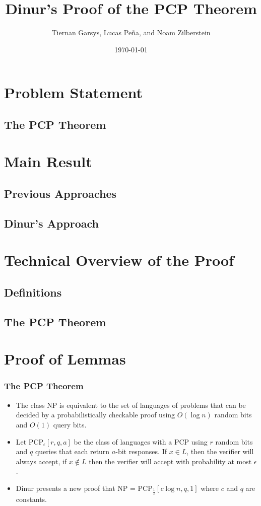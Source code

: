 \documentclass{beamer}
\title{Dinur's Proof of the PCP Theorem}
\author{Tiernan Garsys, Lucas Pe\~{n}a, and Noam Zilberstein}
\date{\today}
\begin{document}
\frame{\titlepage}

\section[Outline]{}
\frame{\tableofcontents}

\section{Problem Statement}
\subsection{The PCP Theorem}
\subsection{}
\section{Main Result}
\subsection{Previous Approaches}
\subsection{Dinur's Approach}
\section{Technical Overview of the Proof}
\subsection{Definitions}
\subsection{The PCP Theorem}
\section{Proof of Lemmas}
\frame
{
  \frametitle{The PCP Theorem}

  \begin{itemize}
  \item<1-> The class NP is equivalent to the set of languages of problems that can be decided by a probabilistically checkable proof using $O(\log n)$ random bits and $O(1)$ query bits.
  \item<2-> Let PCP$_{\epsilon}[r, q, a]$ be the class of languages with a PCP using $r$ random bits and $q$ queries that each return $a$-bit responses.  If $x\in L$, then the verifier will always accept, if $x\not\in L$ then the verifier will accept with probability at most $\epsilon$.   
  \item<3-> Dinur presents a new proof that NP = PCP$_\frac12[c\log n, q, 1]$ where $c$ and $q$ are constants. 
  \end{itemize}
}
\end{document}
